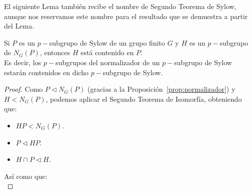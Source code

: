 \noindent
El siguiente Lema también recibe el nombre de Segundo Teorema de Sylow, aunque nos reservamos este nombre para el resultado que se demuestra a partir del Lema.
\begin{lema}
    Si $P$ es un $p-$subgrupo de Sylow de un grupo finito $G$ y $H$ es un $p-$subgrupo de $N_G(P)$, entonces $H$ está contenido en $P$.\\

    \noindent
    Es decir, los $p-$subgrupos del normalizador de un $p-$subgrupo de Sylow estarán contenidos en dicho $p-$subgrupo de Sylow.
    \begin{proof}
        Como $P\lhd N_G(P)$ (gracias a la Proposición~\ref{prop:normalizador}) y $H<N_G(P)$, podemos aplicar el Segundo Teorema de Isomorfía, obteniendo que:
        \begin{itemize}
            \item $HP < N_G(P)$.
            \item $P\lhd HP$.
            \item $H\cap P \lhd H$.
        \end{itemize}
        \begin{figure}[H]
            \centering
        \end{figure}
        \noindent
        Así como que:
        \begin{equation*}

\end{equation*}
\end{proof}
\end{lema}
